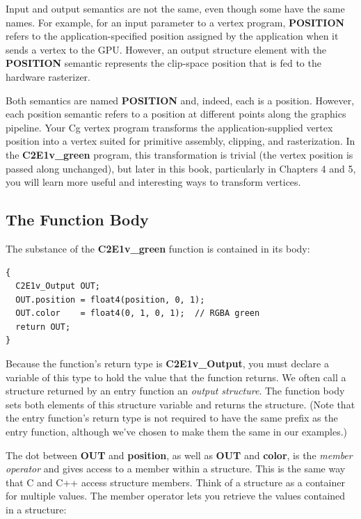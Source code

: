 \documentclass{book}
\begin{document}
Input and output semantics are not the same, even though some have the same names. For example, for an input parameter to a vertex program, \textbf{POSITION} refers to the application-specified position assigned by the application when it sends a vertex to the GPU. However, an output structure element with the \textbf{POSITION} semantic represents the clip-space position that is fed to the hardware rasterizer.

Both semantics are named \textbf{POSITION} and, indeed, each is a position. However, each position semantic refers to a position at different points along the graphics pipeline. Your Cg vertex program transforms the application-supplied vertex position into a vertex suited for primitive assembly, clipping, and rasterization. In the \textbf{C2E1v_green} program, this transformation is trivial (the vertex position is passed along unchanged), but later in this book, particularly in Chapters 4 and 5, you will learn more useful and interesting ways to transform vertices.

\subsection{The Function Body}

The substance of the \textbf{C2E1v_green} function is contained in its body:

\FloatBarrier
\begin{lstlisting}
{
  C2E1v_Output OUT;
  OUT.position = float4(position, 0, 1);
  OUT.color    = float4(0, 1, 0, 1);  // RGBA green
  return OUT;
}
\end{lstlisting}
\FloatBarrier

Because the function's return type is \textbf{C2E1v_Output}, you must declare a variable of this type to hold the value that the function returns. We often call a structure returned by an entry function an \textit{output structure}. The function body sets both elements of this structure variable and returns the structure. (Note that the entry function's return type is not required to have the same prefix as the entry function, although we've chosen to make them the same in our examples.)

The dot between \textbf{OUT} and \textbf{position}, as well as \textbf{OUT} and \textbf{color}, is the \textit{member operator} and gives access to a member within a structure. This is the same way that C and C++ access structure members. Think of a structure as a container for multiple values. The member operator lets you retrieve the values contained in a structure:
\end{document}

